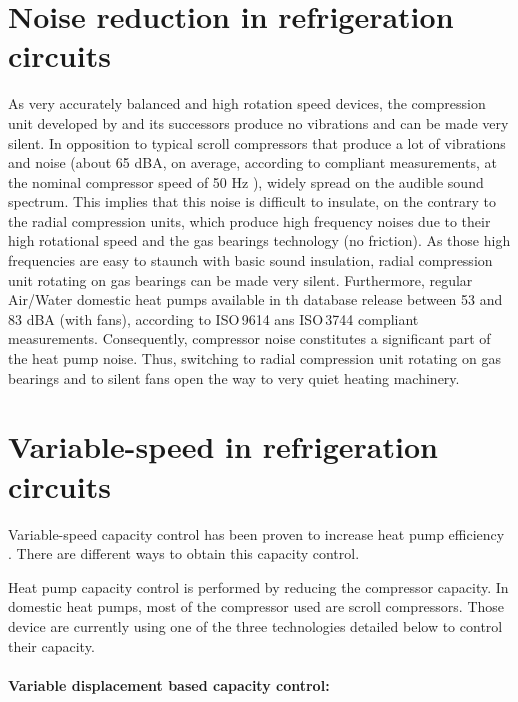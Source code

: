 \section{Noise reduction in refrigeration circuits}

As very accurately balanced and high rotation speed devices, the
compression unit developed by \citet{schiffmann-2008a} and its
successors produce no vibrations and can be made very silent. In
opposition to typical scroll compressors that produce a lot of
vibrations and noise (about 65 dBA, on average, according to
\citet{ARI-270-94} compliant measurements, at the nominal compressor
speed of 50 Hz \citep[Fig.\,43,
p.\,37.26]{ASHRAE-HVACeq-2008a-Compressor}), widely spread on the
audible sound spectrum. This implies that this noise is difficult to
insulate, on the contrary to the radial compression units, which
produce high frequency noises due to their high rotational speed and
the gas bearings technology (no friction). As those high frequencies
are easy to staunch with basic sound insulation, radial compression
unit rotating on gas bearings can be made very silent. Furthermore,
regular Air/Water domestic heat pumps available in th
\citet{Eurovent-2010a} database release between 53 and 83 dBA (with
fans), according to ISO\,9614 \citep{EN-ISO-9614-1} ans ISO\,3744
\citep{ISO-3744-2010a} compliant measurements. Consequently,
compressor noise constitutes a significant part of the heat pump
noise. Thus, switching to radial compression unit rotating on gas
bearings and to silent fans open the way to very quiet heating
machinery.

\section{Variable-speed in refrigeration circuits}

Variable-speed capacity control has been proven to increase heat pump
efficiency \citep{Karlsson-2003a,Karlsson-Fahlen-2008a}. There are
different ways to obtain this capacity control.

Heat pump capacity control is performed by reducing the compressor
capacity.  In domestic heat pumps, most of the compressor used are
scroll compressors.  Those device are currently using one of the three
technologies detailed below to control their capacity.

\paragraph{Variable displacement based capacity control:}

